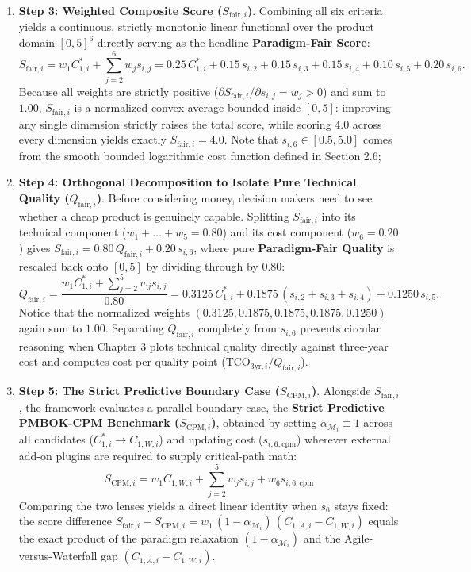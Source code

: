 \begin{enumerate}[leftmargin=2.2em,labelsep=0.5em,itemsep=1.5pt,topsep=1pt]
    \item \textbf{Step 3: Weighted Composite Score ($S_{\text{fair},i}$)}. Combining all six criteria yields a continuous, strictly monotonic linear functional over the product domain $[0, 5]^6$ directly serving as the headline \textbf{Paradigm-Fair Score}:
    $$
        S_{\text{fair},i} = w_1 C_{1,i}^* + \sum_{j=2}^{6} w_j s_{i,j} = 0.25\, C_{1,i}^* + 0.15\, s_{i,2} + 0.15\, s_{i,3} + 0.15\, s_{i,4} + 0.10\, s_{i,5} + 0.20\, s_{i,6}.
    $$
    Because all weights are strictly positive ($\partial S_{\text{fair},i} / \partial s_{i,j} = w_j > 0$) and sum to $1.00$, $S_{\text{fair},i}$ is a normalized convex average bounded inside $[0, 5]$: improving any single dimension strictly raises the total score, while scoring $4.0$ across every dimension yields exactly $S_{\text{fair},i} = 4.0$. Note that $s_{i,6} \in [0.5, 5.0]$ comes from the smooth bounded logarithmic cost function defined in Section 2.6;

    \item \textbf{Step 4: Orthogonal Decomposition to Isolate Pure Technical Quality ($Q_{\text{fair},i}$)}. Before considering money, decision makers need to see whether a cheap product is genuinely capable. Splitting $S_{\text{fair},i}$ into its technical component ($w_1 + \dots + w_5 = 0.80$) and its cost component ($w_6 = 0.20$) gives $S_{\text{fair},i} = 0.80\, Q_{\text{fair},i} + 0.20\, s_{i,6}$, where pure \textbf{Paradigm-Fair Quality} is rescaled back onto $[0, 5]$ by dividing through by $0.80$:
    $$
        Q_{\text{fair},i} = \frac{w_1 C_{1,i}^* + \sum_{j=2}^{5} w_j s_{i,j}}{0.80}
        = 0.3125\, C_{1,i}^* + 0.1875\,(s_{i,2} + s_{i,3} + s_{i,4}) + 0.1250\, s_{i,5}.
    $$
    Notice that the normalized weights $(0.3125, 0.1875, 0.1875, 0.1875, 0.1250)$ again sum to $1.00$. Separating $Q_{\text{fair},i}$ completely from $s_{i,6}$ prevents circular reasoning when Chapter 3 plots technical quality directly against three-year cost and computes cost per quality point ($\text{TCO}_{3\text{yr},i} / Q_{\text{fair},i}$).

    \item \textbf{Step 5: The Strict Predictive Boundary Case ($S_{\text{CPM},i}$)}. Alongside $S_{\text{fair},i}$, the framework evaluates a parallel boundary case, the \textbf{Strict Predictive PMBOK-CPM Benchmark ($S_{\text{CPM},i}$)}, obtained by setting $\alpha_{\mathcal{M}_i} \equiv 1$ across all candidates ($C_{1,i}^* \to C_{1,W,i}$) and updating cost ($s_{i,6,\text{cpm}}$) wherever external add-on plugins are required to supply critical-path math:
    $$
        S_{\text{CPM},i} = w_1 C_{1,W,i} + \sum_{j=2}^{5} w_j s_{i,j} + w_6 s_{i,6,\text{cpm}}
    $$
    Comparing the two lenses yields a direct linear identity when $s_6$ stays fixed: the score difference $S_{\text{fair},i} - S_{\text{CPM},i} = w_1\, (1 - \alpha_{\mathcal{M}_i})\, (C_{1,A,i} - C_{1,W,i})$ equals the exact product of the paradigm relaxation $(1 - \alpha_{\mathcal{M}_i})$ and the Agile-versus-Waterfall gap $(C_{1,A,i} - C_{1,W,i})$. 
\end{enumerate}

